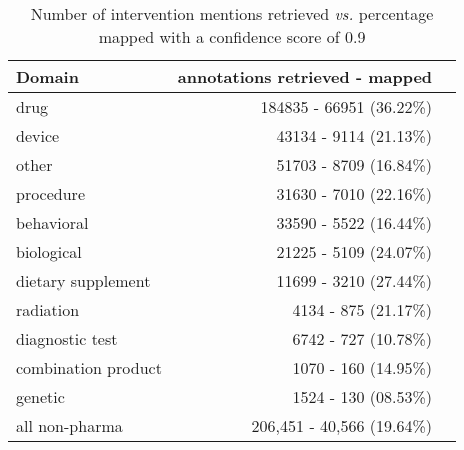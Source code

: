 \documentclass[letterpaper]{article} %
\begin{document}
%
\begin{table}[!htbp]
\centering
\begin{tabular}{lrl}
\hline \textbf{Domain} & \textbf{ annotations retrieved - mapped } \\ \hline
drug & 184835 - 66951 (36.22\%) \\
device & 43134 - 9114 (21.13\%) \\
other & 51703 - 8709 (16.84\%) \\
procedure & 31630 - 7010 (22.16\%) \\
behavioral & 33590 - 5522 (16.44\%) \\
biological & 21225 - 5109 (24.07\%) \\
dietary supplement & 11699 - 3210 (27.44\%) \\
radiation & 4134 - 875 (21.17\%) \\
diagnostic test & 6742 - 727 (10.78\%) \\
combination product & 1070 - 160 (14.95\%) \\
genetic & 1524 - 130 (08.53\%) \\
all non-pharma & 206,451 - 40,566 (19.64\%)\\
\hline
\end{tabular}
\caption{Number of intervention mentions retrieved \textit{vs.} percentage mapped with a confidence score of 0.9}
\label{table:int_type09} 
\end{table}
%
%
%
\end{document}
